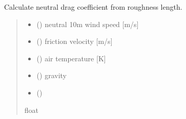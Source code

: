 \documentclass[letterpaper,10pt,english]{sphinxmanual}
\begin{document}

\begin{fulllineitems}
\label{\detokenize{users_guide:AirSeaFluxCode.flux_subs.drag_coef.cdn_from_roughness}}
\pysigstartsignatures
\pysiglinewithargsret
{}
{\sphinxparamcomma {}\sphinxparamcomma {}\sphinxparamcomma {}\sphinxparamcomma {}}
{}
\pysigstopsignatures
\sphinxAtStartPar
Calculate neutral drag coefficient from roughness length.
\begin{quote}\begin{description}
\begin{itemize}
\item {}
\sphinxAtStartPar
{} () \textendash{} neutral 10m wind speed {[}m/s{]}

\item {}
\sphinxAtStartPar
{} () \textendash{} friction velocity      {[}m/s{]}

\item {}
\sphinxAtStartPar
{} () \textendash{} air temperature        {[}K{]}

\item {}
\sphinxAtStartPar
{} (\sphinxstyleliteralemphasis{\sphinxupquote{                {[}}}\sphinxstyleliteralemphasis{\sphinxupquote{{]}}}) \textendash{} gravity

\item {}
\sphinxAtStartPar
{} ()

\end{itemize}

\sphinxAtStartPar
{}

\sphinxAtStartPar
float

\end{description}\end{quote}

\end{fulllineitems}
\end{document}
